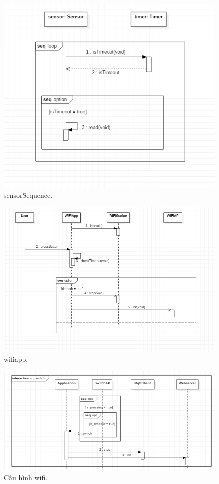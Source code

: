 \documentclass[a4paper,12pt,oneside]{article}
\begin{document}
\begin{itemize}
\begin{figure}[H]
	\centering
	\includegraphics[scale=.8]{hinh/sensorSequence.PNG}
	\caption{sensorSequence.}
\end{figure}

\begin{figure}[H]
	\centering
	\includegraphics[scale=.8]{hinh/wifiapp.PNG}
	\caption{wifiapp.}
\end{figure}

\begin{figure}[H]
	\centering
	\includegraphics[scale=.9]{hinh/sq_switch_wifi.PNG}
	\caption{Cấu hình wifi.}
\end{figure}


\end{itemize}
\end{document}
